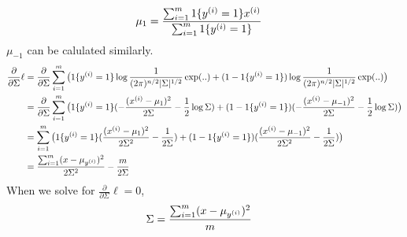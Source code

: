 \documentclass[11pt]{article}
\begin{document}
\begin{enumerate}
  \begin{align*}
    \mu_1 &= \frac{\sum_{i=1}^{m}1\{y^{(i)}=1\} x^{(i)}}{\sum_{i=1}^{m}1\{y^{(i)}=1\}}
  \end{align*}
  $\mu_{-1}$ can be calulated similarly.
  \begin{align*}
    \frac{\partial}{\partial\Sigma}\ell
    &= \frac{\partial}{\partial\Sigma} \sum_{i=1}^{m} \big( 1\{y^{(i)}=1\}\log\frac{1}{(2\pi)^{n/2}|\Sigma|^{1/2}}\exp(..) + (1-1\{y^{(i)}=1\})\log\frac{1}{(2\pi)^{n/2}|\Sigma|^{1/2}}\exp(..) \big)\\
    &= \frac{\partial}{\partial\Sigma} \sum_{i=1}^{m} \big( 1\{y^{(i)}=1\}(-\frac{(x^{(i)}-\mu_1)^2}{2\Sigma}-\frac{1}{2}\log\Sigma) + (1-1\{y^{(i)}=1\})(-\frac{(x^{(i)}-\mu_{-1})^2}{2\Sigma}-\frac{1}{2}\log\Sigma) \big)\\
    &= \sum_{i=1}^{m} \big( 1\{y^{(i)}=1\}(\frac{(x^{(i)}-\mu_1)^2}{2\Sigma^2}-\frac{1}{2\Sigma}) + (1-1\{y^{(i)}=1\})(\frac{(x^{(i)}-\mu_{-1})^2}{2\Sigma^2}-\frac{1}{2\Sigma}) \big)\\
    &= \frac{\sum_{i=1}^{m}(x-\mu_{y^{(i)}})^2}{2\Sigma^2} - \frac{m}{2\Sigma}
  \end{align*}
  When we solve for $   \frac{\partial}{\partial\Sigma}\ell = 0 $, 
  \begin{align*}
    \Sigma &= \frac{\sum_{i=1}^{m}(x-\mu_{y^{(i)}})^2}{m}
  \end{align*}
\end{enumerate}  
\end{document}
